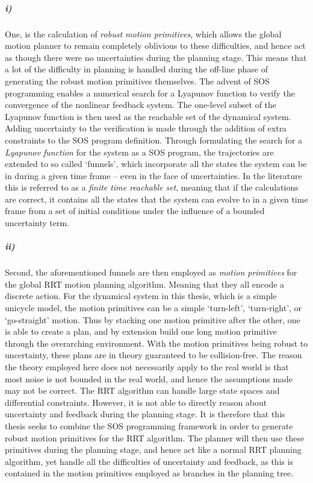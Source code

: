 \subparagraph{i)} One, is the calculation of \textit{robust motion primitives},
which allows the global motion planner to remain completely oblivious to these
difficulties, and hence act as though there were no uncertainties during the
planning stage. This means that a lot of the difficulty in planning is handled
during the off-line phase of generating the robust motion primitives themselves.
The advent of \ac{SOS} programming enables a numerical search for a Lyapunov
function to verify the convergence of the nonlinear feedback system. The
one-level subset of the Lyapunov function is then used as the reachable set of
the dynamical system. Adding uncertainty to the verification is made through the
addition of extra constraints to the \ac{SOS} program definition. Through
formulating the search for a \textit{Lyapunov function} for the system as a
\ac{SOS} program, the trajectories are extended to so called `funnels', which
incorporate all the states the system can be in during a given time frame --
even in the face of uncertainties. In the literature this is referred to as a
\textit{finite time reachable set}, meaning that if the calculations are
correct, it contains all the states that the system can evolve to in a given
time frame from a set of initial conditions under the influence of a bounded
uncertainty term.


\subparagraph{ii)} Second, the aforementioned funnels are then employed as
\textit{motion primitives} for the global \ac{RRT} motion planning algorithm.
Meaning that they all encode a discrete action. For the dynamical system in this
thesis, which is a simple unicycle model, the motion primitives can be a simple
`turn-left', `turn-right', or `go-straight' motion. Thus by stacking one motion
primitive after the other, one is able to create a plan, and by extension build
one long motion primitive through the overarching environment. With the motion
primitives being robust to uncertainty, these plans are in theory guaranteed to
be collision-free. The reason the theory employed here does not necessarily
apply to the real world is that most noise is not bounded in the real world, and
hence the assumptions made may not be correct. The \ac{RRT} algorithm can handle
large state spaces and differential constraints. However, it is not able to
directly reason about uncertainty and feedback during the planning stage. It is
therefore that this thesis seeks to combine the \ac{SOS} programming framework
in order to generate robust motion primitives for the \ac{RRT} algorithm. The
planner will then use these primitives during the planning stage, and hence act
like a normal \ac{RRT} planning algorithm, yet handle all the difficulties of
uncertainty and feedback, as this is contained in the motion primitives employed
as branches in the planning tree.

